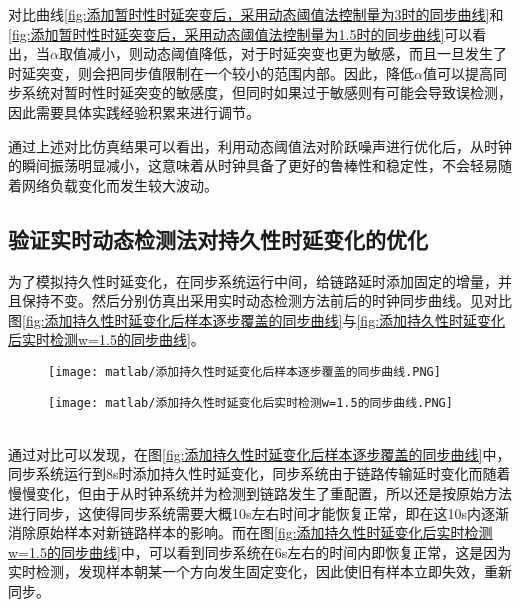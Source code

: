 对比曲线\ref{fig:添加暂时性时延突变后，采用动态阈值法控制量为3时的同步曲线}和\ref{fig:添加暂时性时延突变后，采用动态阈值法控制量为1.5时的同步曲线}可以看出，当$\alpha$取值减小，则动态阈值降低，对于时延突变也更为敏感，而且一旦发生了时延突变，则会把同步值限制在一个较小的范围内部。因此，降低$\alpha$值可以提高同步系统对暂时性时延突变的敏感度，但同时如果过于敏感则有可能会导致误检测，因此需要具体实践经验积累来进行调节。

通过上述对比仿真结果可以看出，利用动态阈值法对阶跃噪声进行优化后，从时钟的瞬间振荡明显减小，这意味着从时钟具备了更好的鲁棒性和稳定性，不会轻易随着网络负载变化而发生较大波动。

\subsection{验证实时动态检测法对持久性时延变化的优化}
为了模拟持久性时延变化，在同步系统运行中间，给链路延时添加固定的增量，并且保持不变。然后分别仿真出采用实时动态检测方法前后的时钟同步曲线。见对比图\ref{fig:添加持久性时延变化后样本逐步覆盖的同步曲线}与\ref{fig:添加持久性时延变化后实时检测w=1.5的同步曲线}。
\begin{figure}[htbp]
  \centering
  \begin{minipage}[b]{1\textwidth}
    \captionstyle{\centering}
    \centering
    \texttt{[image: matlab/添加持久性时延变化后样本逐步覆盖的同步曲线.PNG]}
  \end{minipage}     
\end{figure}
\begin{figure}[hbp]
  \centering
  \begin{minipage}[b]{1\textwidth}
    \captionstyle{\centering}
    \centering
    \texttt{[image: matlab/添加持久性时延变化后实时检测w=1.5的同步曲线.PNG]}
  \end{minipage}     
\end{figure}
\\ 

通过对比可以发现，在图\ref{fig:添加持久性时延变化后样本逐步覆盖的同步曲线}中，同步系统运行到8s时添加持久性时延变化，同步系统由于链路传输延时变化而随着慢慢变化，但由于从时钟系统并为检测到链路发生了重配置，所以还是按原始方法进行同步，这使得同步系统需要大概10s左右时间才能恢复正常，即在这10s内逐渐消除原始样本对新链路样本的影响。而在图\ref{fig:添加持久性时延变化后实时检测w=1.5的同步曲线}中，可以看到同步系统在6s左右的时间内即恢复正常，这是因为实时检测，发现样本朝某一个方向发生固定变化，因此使旧有样本立即失效，重新同步。

